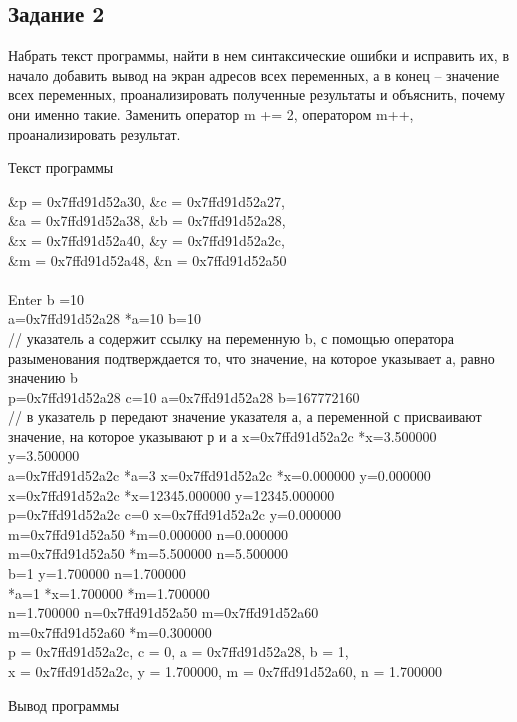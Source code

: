 \documentclass[a4paper,14pt]{extarticle}
\begin{document}
\subsection{Задание 2}
Набрать текст программы, найти в нем синтаксические ошибки и исправить их, в начало добавить вывод на экран адресов всех переменных, а в конец -- значение всех переменных, проанализировать полученные результаты и объяснить, почему они именно такие. Заменить оператор m += 2, оператором m++, проанализировать результат.

\begin{center}
Текст программы
\end{center}
\&p = 0x7ffd91d52a30, \&c = 0x7ffd91d52a27,\\ \&a = 0x7ffd91d52a38, \&b = 0x7ffd91d52a28,\\
\&x = 0x7ffd91d52a40, \&y = 0x7ffd91d52a2c,\\ \&m = 0x7ffd91d52a48, \&n = 0x7ffd91d52a50\\\\
Enter b =10\\
a=0x7ffd91d52a28	*a=10	b=10\\
// указатель а содержит ссылку на переменную b, с помощью оператора разыменования подтверждается то, что значение, на которое указывает а, равно значению b\\ 
p=0x7ffd91d52a28	c=10	a=0x7ffd91d52a28	b=167772160\\
// в указатель р передают значение указателя а, а переменной с присваивают значение, на которое указывают р и а
x=0x7ffd91d52a2c	*x=3.500000	y=3.500000\\
a=0x7ffd91d52a2c	*a=3	x=0x7ffd91d52a2c	*x=0.000000	y=0.000000\\
x=0x7ffd91d52a2c	*x=12345.000000	y=12345.000000\\
p=0x7ffd91d52a2c	c=0	x=0x7ffd91d52a2c	y=0.000000\\
m=0x7ffd91d52a50	*m=0.000000	n=0.000000\\
m=0x7ffd91d52a50	*m=5.500000	n=5.500000\\
b=1	y=1.700000	n=1.700000\\
*a=1	*x=1.700000	*m=1.700000\\
n=1.700000	n=0x7ffd91d52a50	m=0x7ffd91d52a60\\
m=0x7ffd91d52a60	*m=0.300000\\
p = 0x7ffd91d52a2c, c = 0, a = 0x7ffd91d52a28, b = 1,\\
x = 0x7ffd91d52a2c, y = 1.700000, m = 0x7ffd91d52a60, n = 1.700000\\

\begin{center}
Вывод программы
\end{center}
\end{document}
